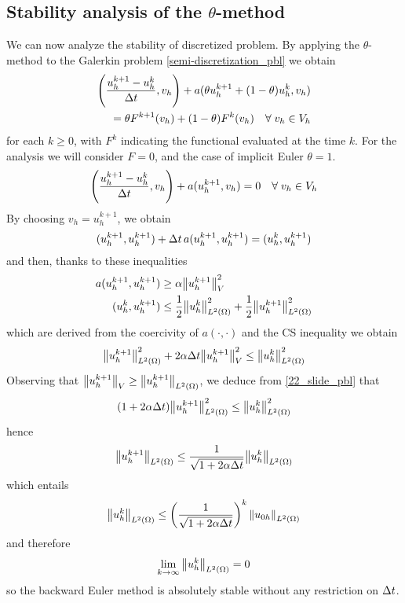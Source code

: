 \subsection{Stability analysis of the \texorpdfstring{\(\theta\)}{theta}-method}
We can now analyze the stability of discretized problem. 
By applying the \(\theta\)-method to the Galerkin problem \eqref{semi-discretization_pbl} we obtain 
\begin{equation}
    \begin{split}
        \left( \frac{u_h^{k+1}-u_h^k}{\Delta t}, v_h \right) + a(\theta u_h^{k+1} + (1-\theta) u^k_h, v_h) \\
        = \theta F^{k+1}(v_h) + (1-\theta) F^k(v_h) \quad \forall \; v_h \in V_h
    \end{split}
    \label{theta_method_stab_pbl}
\end{equation}
for each \(k \geq 0\), with \(F^k\) indicating the functional evaluated at the time \(k\).
For the analysis we will consider \(F=0\), and the case of implicit Euler \(\theta = 1\).
\[
    \left( \frac{u_h^{k+1}-u^k_h}{\Delta t}, v_h \right) + a(u^{k+1}_h, v_h) = 0 \quad \forall \; v_h \in V_h
\]
By choosing \(v_h = u_h^{k+1}\), we obtain 
\[
    ( u_h^{k+1}, u_h^{k+1} ) +\Delta t \, a(u^{k+1}_h, u_h^{k+1}) = (u_h^{k}, u_h^{k+1})
\]
and then, thanks to these inequalities 
\begin{align*}
    a(u_h^{k+1}, u_h^{k+1}) &\geq \alpha \norm{u_h^{k+1}}_V^2 \\
    (u_h^{k},u_h^{k+1}) &\leq \frac{1}{2} \norm{u_h^{k}}_{L^2(\Omega)}^2 + \frac{1}{2} \norm{u_h^{k+1}}_{L^2(\Omega)}^2
\end{align*}
which are derived from the coercivity of \(a(\cdot, \cdot)\) and the CS inequality we obtain 
\begin{equation}
    \norm{u_h^{k+1}}_{L^2(\Omega)}^2 +2\alpha \Delta t \norm{u_h^{k+1}}_V^2 \leq \norm{u_h^{k}}_{L^2(\Omega)}^2
    \label{22_slide_pbl}
\end{equation}
Observing that \(\norm{u_h^{k+1}}_V \geq \norm{u_h^{k+1}}_{L^2(\Omega)}\), we deduce from \eqref{22_slide_pbl} that 
\[
    (1+2\alpha \Delta t)\norm{u_h^{k+1}}_{L^2(\Omega)}^2 \leq \norm{u_h^{k}}_{L^2(\Omega)}^2
\]
hence 
\[
    \norm{u_h^{k+1}}_{L^2(\Omega)} \leq \frac{1}{\sqrt{1+2\alpha \Delta t}} \norm{u_h^{k}}_{L^2(\Omega)}
\]
which entails 
\[
    \norm{u_h^{k}}_{L^2(\Omega)} \leq \left( \frac{1}{\sqrt{1+2\alpha \Delta t}} \right)^k\norm{u_{0h}}_{L^2(\Omega)}
\]
and therefore 
\[
    \lim_{k\to \infty} \norm{u_h^{k}}_{L^2(\Omega)} = 0
\]
so the backward Euler method is absolutely stable without any restriction on \(\Delta t\).

